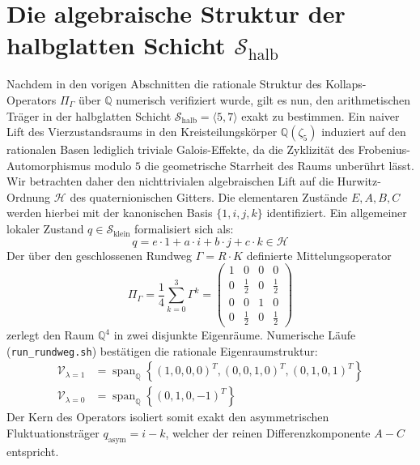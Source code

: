 \section{Die algebraische Struktur der halbglatten Schicht $\mathcal{S}_{\mathrm{halb}}$}
\label{sec:schalenstruktur}
Nachdem in den vorigen Abschnitten die rationale Struktur des Kollaps-Operators $\Pi_\Gamma$ über $\mathbb{Q}$ numerisch verifiziert wurde, gilt es nun, den arithmetischen Träger in der halbglatten Schicht $\mathcal{S}_{\mathrm{halb}} = \langle 5, 7 \rangle$ exakt zu bestimmen. Ein naiver Lift des Vierzustandsraums in den Kreisteilungskörper $\mathbb{Q}(\zeta_5)$ induziert auf den rationalen Basen lediglich triviale Galois-Effekte, da die Zyklizität des Frobenius-Automorphismus modulo $5$ die geometrische Starrheit des Raums unberührt lässt.
Wir betrachten daher den nichttrivialen algebraischen Lift auf die Hurwitz-Ordnung $\mathcal{H}$ des quaternionischen Gitters. Die elementaren Zustände $E, A, B, C$ werden hierbei mit der kanonischen Basis $\{1, i, j, k\}$ identifiziert. Ein allgemeiner lokaler Zustand $q \in \mathcal{S}_{\mathrm{klein}}$ formalisiert sich als:
\begin{equation}
    q = e \cdot 1 + a \cdot i + b \cdot j + c \cdot k \in \mathcal{H}
\end{equation}
Der über den geschlossenen Rundweg $\Gamma = R \cdot K$ definierte Mittelungsoperator
\begin{equation}
    \Pi_\Gamma = \frac{1}{4} \sum_{k=0}^{3} \Gamma^k = \begin{pmatrix} 1 & 0 & 0 & 0 \\ 0 & \frac{1}{2} & 0 & \frac{1}{2} \\ 0 & 0 & 1 & 0 \\ 0 & \frac{1}{2} & 0 & \frac{1}{2} \end{pmatrix}
\end{equation}
zerlegt den Raum $\mathbb{Q}^4$ in zwei disjunkte Eigenräume. Numerische Läufe (\texttt{run\_rundweg.sh}) bestätigen die rationale Eigenraumstruktur:
\begin{align}
    \mathcal{V}_{\lambda=1} &= \operatorname{span}_{\mathbb{Q}} \left\{ (1,0,0,0)^T, (0,0,1,0)^T, (0,1,0,1)^T \right\} \\
    \mathcal{V}_{\lambda=0} &= \operatorname{span}_{\mathbb{Q}} \left\{ (0,1,0,-1)^T \right\}
\end{align}
Der Kern des Operators isoliert somit exakt den asymmetrischen Fluktuationsträger $q_{\mathrm{asym}} = i - k$, welcher der reinen Differenzkomponente $A - C$ entspricht.
